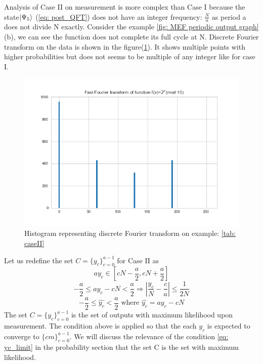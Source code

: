 Analysis of Case II on measurement is more complex than Case I because the state$\ket{\Psi_5}$ (\ref{eq: post_QFT}) does not have an integer frequency: $\frac{N}{a}$ as period a does not divide N exactly. Consider the example \ref{fig: MEF periodic output graph}(b), we can see the function does not complete its full cycle at N. Discrete Fourier transform on the data is shown in the figure(\ref{fig: fft_on_2^xmod15}). It shows multiple points with higher probabilities but does not seems to be multiple of any integer like for case I. 
\begin{figure}[H]
  \centering
  \includegraphics[scale=0.6]{figures/fft_on_2^xmod15.png}
  \caption{Histogram representing discrete Fourier transform on example: \ref{tab: caseII}}
  \label{fig: fft_on_2^xmod15}
\end{figure}

Let us redefine the set $C=\{y_c\}_{c=0}^{a-1}$ for Case II as 
\begin{equation}
    a y_c \in [cN -\frac{a}{2}, cN + \frac{a}{2}]
    \label{eq: yc_limit}
\end{equation}
\begin{equation}
    -\frac{a}{2} \leq a y_c-cN < \frac{a}{2} \Rightarrow |\frac{y_c}{N} -\frac{c}{a}| \leq \frac{1}{2N}
    \label{eq: yc_cont_limit}
\end{equation}
\begin{equation}
    -\frac{a}{2} \leq \hat{y_c} < \frac{a}{2} \text{ where } \hat{y_c} =a y_c-cN
    \label{eq: yc_hat_limit}
\end{equation}
The set $C=\{y_c\}_{c=0}^{a-1}$ is the set of outputs with maximum likelihood upon measurement. The condition above is applied so that the each $y_c$ is expected to converge to $\{cm\}_{c=0}^{a-1}$. We will discuss the relevance of the condition \ref{eq: yc_limit} in the probability section that the set C is the set with maximum likelihood.

